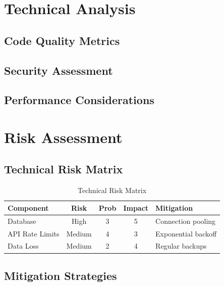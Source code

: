 \chapter{Technical Analysis}
\cleardoublepage

\section{Code Quality Metrics}

\section{Security Assessment}

\section{Performance Considerations}


\chapter{Risk Assessment}
\cleardoublepage

\section{Technical Risk Matrix}

\begin{table}[htbp]
\centering
\caption{Technical Risk Matrix}
\label{tbl:risk-matrix}
\begin{tabular}{|l|c|c|c|p{4cm}|}
\hline
\textbf{Component} & \textbf{Risk} & \textbf{Prob} & \textbf{Impact} & \textbf{Mitigation} \\
\hline
Database & High & 3 & 5 & Connection pooling \\
\hline
API Rate Limits & Medium & 4 & 3 & Exponential backoff \\
\hline
Data Loss & Medium & 2 & 4 & Regular backups \\
\hline
\end{tabular}
\end{table}

\section{Mitigation Strategies}

